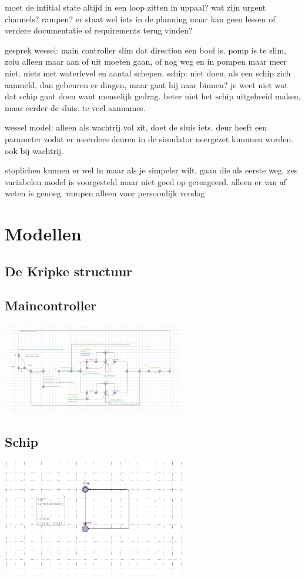 \documentclass{article}
\begin{document}
	moet de intitial state altijd in een loop zitten in uppaal?
	wat zijn urgent channels?
	rampen? er staat wel iets in de planning maar kan geen lessen of verdere documentatie of requirements terug vinden?	
	
	
	gesprek wessel:
	main controller slim dat direction een bool is. 
	pomp is te slim, zoiu alleen maar aan of uit moeten gaan, of nog weg en in pompen maar meer niet. niets met waterlevel en aantal schepen.
	schip: niet doen. als een schip zich aanmeld, dan gebeuren er dingen, maar gaat hij naar binnen? je weet niet wat dat schip gaat doen want menselijk gedrag. beter niet het schip uitgebreid maken, maar eerder de sluis. te veel aannames.
	
	wessel model: alleen als wachtrij vol zit, doet de sluis iets.
	deur heeft een parameter zodat er meerdere deuren in de simulator neergezet kunnnen worden. ook bij wachtrij.
	
	stoplichen kunnen er wel in maar als je simpeler wilt, gaan die als eerste weg.
	zes variabelen model is voorgesteld maar niet goed op gereageerd. alleen er van af weten is genoeg.
	rampen alleen voor persoonlijk verslag
	
	
	
	\section{Modellen}
	
	\subsection{De Kripke structuur}
	
	\subsection{Maincontroller}
	\includegraphics[width=8cm]{main.png} %
	\subsection{Schip}
	\includegraphics[width=8cm]{schip.png} %
\end{document}
